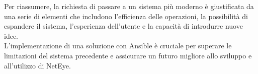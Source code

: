 Per riassumere, la richiesta di passare a un sistema più moderno è giustificata da
una serie di elementi che includono l'efficienza delle operazioni, la
possibilità di espandere il sistema, l'esperienza dell'utente e la capacità di introdurre
nuove idee.\\ L'implementazione di una soluzione con Ansible è cruciale per superare
le limitazioni del sistema precedente e assicurare un futuro migliore allo sviluppo
e all'utilizzo di NetEye.